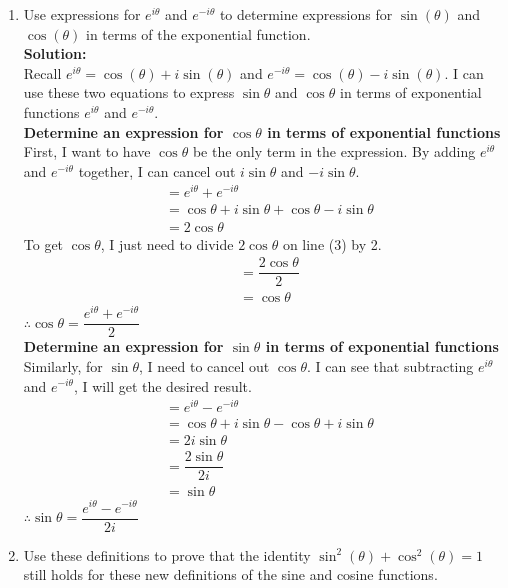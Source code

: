 \documentclass[12pt]{book}
\begin{document}
\begin{enumerate}
\begin{enumerate}
\item Use expressions for $e^{i\theta}$ and $e^{-i\theta}$ to determine expressions for $\sin(\theta)$ and $\cos(\theta)$ in terms of the exponential function.\\

\textbf{Solution:}\\
Recall $e^{i\theta} = \cos(\theta)+i\sin(\theta)$ and $e^{-i\theta} = \cos(\theta) - i\sin(\theta)$. I can use these two equations to express $\sin\theta$ and $\cos\theta$ in terms of exponential functions $e^{i\theta}$ and $e^{-i\theta}$.\\

\textbf{Determine an expression for $\cos\theta$ in terms of exponential functions}\\
First, I want to have $\cos\theta$ be the only term in the expression. By adding $e^{i\theta}$ and $e^{-i\theta}$ together, I can cancel out $i\sin\theta$ and $-i\sin\theta$.
\setcounter{equation}{0}
\begin{align}
    &= e^{i\theta} + e^{-i\theta} \\
    &= \cos\theta + i\sin\theta + \cos\theta - i\sin\theta \\
    &= 2\cos\theta
\end{align}
To get $\cos\theta$, I just need to divide $2\cos\theta$ on line (3) by 2.
\begin{align}
    &= \dfrac{2\cos\theta}{2} \\
    &= \cos\theta
\end{align}
$\therefore \cos\theta = \dfrac{e^{i\theta} + e^{-i\theta}}{2}$\\

\textbf{Determine an expression for $\sin\theta$ in terms of exponential functions}\\
Similarly, for $\sin\theta$, I need to cancel out $\cos\theta$. I can see that subtracting $e^{i\theta}$ and $e^{-i\theta}$, I will get the desired result.
\begin{align}
    &= e^{i\theta} - e^{-i\theta} \\
    &= \cos\theta + i\sin\theta - \cos\theta + i\sin\theta \\
    &= 2i\sin\theta\\
    &= \dfrac{2\sin\theta}{2i} \\
    &= \sin\theta
\end{align}
$\therefore \sin\theta = \dfrac{e^{i\theta} - e^{-i\theta}}{2i}$

\item Use these definitions to prove that the identity $\sin^2(\theta) + \cos^2(\theta) = 1$ still holds for these new definitions of the sine and cosine functions.\\


\end{enumerate}
\end{enumerate}
\end{document}
